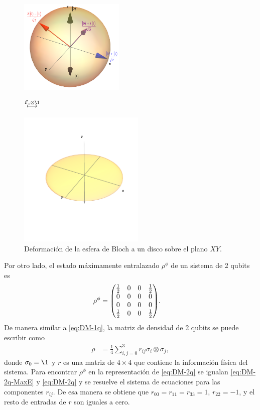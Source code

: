 \begin{figure}%
\centering
\begin{minipage}{.4\textwidth}
\centering
\includegraphics[width=5cm]
{img-congreso/bloch.png}
\end{minipage}
$\stackrel{\E_{z}\otimes\1 \vspace{1cm}}{\longmapsto}$
\begin{minipage}{0.4\textwidth}
\centering
\includegraphics[width=6cm]
{img-congreso/DiskXY}
\end{minipage}
\caption{
Deformación de la esfera de Bloch a un disco sobre el plano $XY$.}
\label{fig:qtm-op-motivation}
\end{figure} %

Por otro lado, el estado máximamente entralazado $\rho^{\phi}$ de 
un sistema de 2 qubits es \cite{bengtsson_zyczkowski_2017}
\begin{align}
\rho^{\phi}&=
\mqty( 
\frac{1}{2} & 0 & 0 & \frac{1}{2} \\
0 & 0 & 0 & 0 \\
0 & 0 & 0 & 0 \\
\frac{1}{2} & 0 & 0 & \frac{1}{2} \\
).
\label{eq:DM-2q-MaxE}
\end{align}
De manera similar a \eqref{eq:DM-1q}, la matriz de densidad 
de 2 qubits se puede escribir como
\begin{align}
\rho&=\frac{1}{4}\sum _{i,j=0}^{3}r_{ij}\sigma_i\otimes\sigma_j,
\label{eq:DM-2q}
\end{align}
donde $\sigma_0=\1$ y $r$ es una matriz de $4\times4$ que contiene
la información física del sistema. Para encontrar $\rho^{\phi}$ en la
representación de \eqref{eq:DM-2q} se igualan 
\eqref{eq:DM-2q-MaxE} y \eqref{eq:DM-2q} y se resuelve
el sistema de ecuaciones para las componentes $r_{ij}$. De esa manera
se obtiene que $r_{00}=r_{11}=r_{33}=1$, $r_{22}=-1$, y el resto de 
entradas de $r$ son iguales a cero. 

